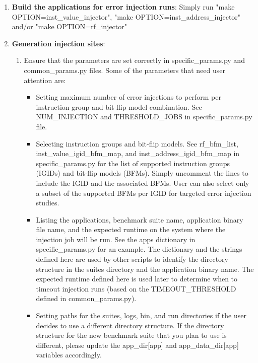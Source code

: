 \begin{enumerate}
\item {\bf Build the applications for error injection runs}:
		Simply run "make OPTION=inst\_value\_injector", "make OPTION=inst\_address\_injector" 
		and/or "make OPTION=rf\_injector"
\label{step6}

\item {\bf Generation injection sites}:
		\begin{enumerate}
			\item Ensure that the parameters are set correctly in specific\_params.py and
			common\_params.py files.  Some of the parameters that need user attention
			are: 
			\begin{itemize}
				\item Setting maximum number of error injections to perform per instruction
				group and bit-flip model combination. See NUM\_INJECTION and
				THRESHOLD\_JOBS in specific\_params.py file. 

				\item Selecting instruction groups and bit-flip models. See 
				rf\_bfm\_list,  inst\_value\_igid\_bfm\_map, and 
				inst\_address\_igid\_bfm\_map in specific\_params.py for the list of
				supported instruction groups (IGIDs) and bit-flip models (BFMs). Simply
				uncomment the lines to include the IGID and the associated BFMs. User
				can also select only a subset of the supported BFMs per IGID for
				targeted error injection studies.

				\item Listing the applications, benchmark suite name, application
				binary file name, and the expected runtime on the system where the
				injection job will be run. See the apps dictionary in
				specific\_params.py for an example. The dictionary and the strings
				defined here are used by other scripts to identify the directory
				structure in the suites directory and the application binary name.  The
				expected runtime defined here is used later to determine when to
				timeout injection runs (based on the TIMEOUT\_THRESHOLD defined in
				common\_params.py).

				\item Setting paths for the suites, logs, bin, and run directories if
				the user decides to use a different directory structure. If the
				directory structure for the new benchmark suite that you plan to use is different,
				please update the app\_dir[app] and app\_data\_dir[app] variables
				accordingly. 
			

\end{itemize}
\end{enumerate}
\end{enumerate}
